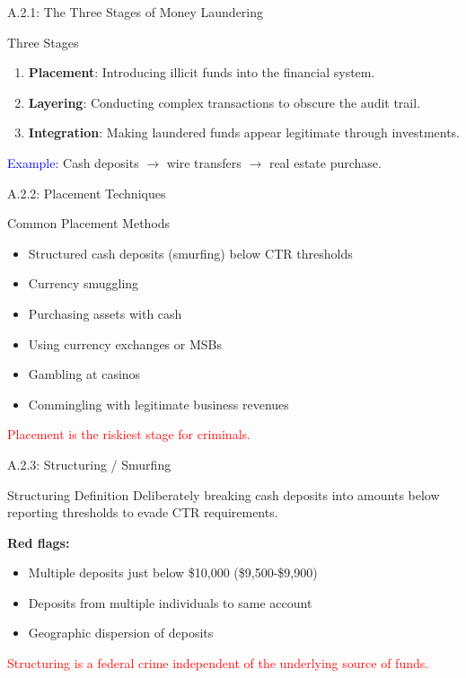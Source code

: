 \documentclass{beamer}
\begin{document}
	
	\begin{frame}{A.2.1: The Three Stages of Money Laundering}
		\begin{block}{Three Stages}
			\begin{enumerate}
				\item \textbf{Placement}: Introducing illicit funds into the financial system.
				\item \textbf{Layering}: Conducting complex transactions to obscure the audit trail.
				\item \textbf{Integration}: Making laundered funds appear legitimate through investments.
			\end{enumerate}
		\end{block}
		\textcolor{blue}{Example:} Cash deposits $\rightarrow$ wire transfers $\rightarrow$ real estate purchase.
	\end{frame}
	
	\begin{frame}{A.2.2: Placement Techniques}
		\begin{block}{Common Placement Methods}
			\begin{itemize}
				\item Structured cash deposits (smurfing) below CTR thresholds
				\item Currency smuggling
				\item Purchasing assets with cash
				\item Using currency exchanges or MSBs
				\item Gambling at casinos
				\item Commingling with legitimate business revenues
			\end{itemize}
		\end{block}
		\textcolor{red}{Placement is the riskiest stage for criminals.}
	\end{frame}
	
	\begin{frame}{A.2.3: Structuring / Smurfing}
		\begin{block}{Structuring Definition}
			Deliberately breaking cash deposits into amounts below reporting thresholds to evade CTR requirements.
		\end{block}
		\textbf{Red flags:}
		\begin{itemize}
			\item Multiple deposits just below \$10,000 (\$9,500-\$9,900)
			\item Deposits from multiple individuals to same account
			\item Geographic dispersion of deposits
		\end{itemize}
		\textcolor{red}{Structuring is a federal crime independent of the underlying source of funds.}
	\end{frame}
	
\end{document}
